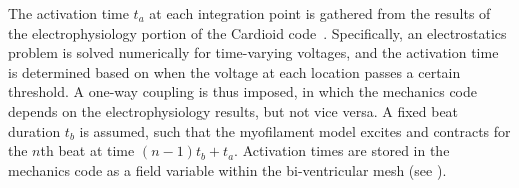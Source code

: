 The activation time $t_a$ at each integration point is gathered from the results of the electrophysiology portion of the Cardioid code~\cite{richards_2013}. Specifically, an electrostatics problem is solved numerically for time-varying voltages, and the activation time is determined based on when the voltage at each location passes a certain threshold. A one-way coupling is thus imposed, in which the mechanics code depends on the electrophysiology results, but not vice versa. A fixed beat duration $t_b$ is assumed, such that the myofilament model excites and contracts for the $n$th beat at time $(n-1)t_b + t_a$. Activation times are stored in the mechanics code as a field variable within the bi-ventricular mesh (see ).

\begin{figure}
\centering
{}
\end{figure}
